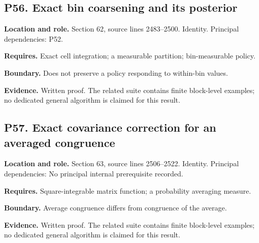 \documentclass[11pt,oneside,openany]{book}
\numberwithin{equation}{section}
\begin{document}
\par\noindent\begin{minipage}{\textwidth}
\subsection{P56. Exact bin coarsening and its
posterior}\label{LSMRegister:p56.-exact-bin-coarsening-and-its-posterior}

\textbf{Location and role.} Section 62, source lines 2483--2500.
Identity. Principal dependencies: P52.

\textbf{Requires.} Exact cell integration; a measurable partition;
bin-measurable policy.

\textbf{Boundary.} Does not preserve a policy responding to within-bin
values.

\textbf{Evidence.} Written proof. The related suite contains finite
block-level examples; no dedicated general algorithm is claimed for this
result.
\end{minipage}\par\medskip

\par\noindent\begin{minipage}{\textwidth}
\subsection{P57. Exact covariance correction for an averaged
congruence}\label{LSMRegister:p57.-exact-covariance-correction-for-an-averaged-congruence}

\textbf{Location and role.} Section 63, source lines 2506--2522.
Identity. Principal dependencies: No principal internal prerequisite
recorded.

\textbf{Requires.} Square-integrable matrix function; a probability
averaging measure.

\textbf{Boundary.} Average congruence differs from congruence of the
average.

\textbf{Evidence.} Written proof. The related suite contains finite
block-level examples; no dedicated general algorithm is claimed for this
result.
\end{minipage}\par\medskip
\end{document}
